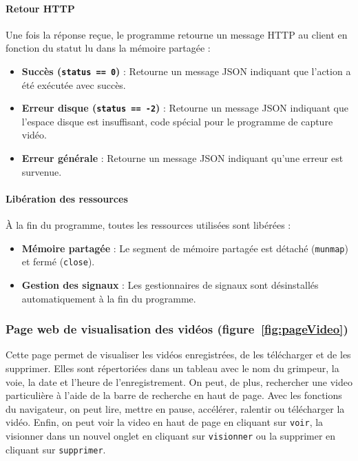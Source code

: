 \documentclass[a4paper, 11pt, french]{article}
\begin{document}
\paragraph{Retour HTTP}
Une fois la réponse reçue, le programme retourne un message HTTP au client en fonction du statut lu dans la mémoire partagée :
\begin{itemize}
    \item \textbf{Succès (\texttt{status == 0})} : Retourne un message JSON indiquant que l'action a été exécutée avec succès.
    \item \textbf{Erreur disque (\texttt{status == -2})} : Retourne un message JSON indiquant que l'espace disque est insuffisant, code spécial pour le programme de capture vidéo.
    \item \textbf{Erreur générale} : Retourne un message JSON indiquant qu'une erreur est survenue.
\end{itemize}

\paragraph{Libération des ressources}
À la fin du programme, toutes les ressources utilisées sont libérées :
\begin{itemize}
    \item \textbf{Mémoire partagée} : Le segment de mémoire partagée est détaché (\texttt{munmap}) et fermé (\texttt{close}).
    \item \textbf{Gestion des signaux} : Les gestionnaires de signaux sont désinstallés automatiquement à la fin du programme.
\end{itemize}


\subsubsection{Page web de visualisation des vidéos (figure~\ref{fig:pageVideo})}
Cette page permet de visualiser les vidéos enregistrées, de les télécharger et de les supprimer. Elles sont répertoriées dans un tableau avec le nom du grimpeur, la voie, la date et l'heure de l'enregistrement. On peut, de plus, rechercher une video particulière à l'aide de la barre de recherche en haut de page. Avec les fonctions du navigateur, on peut lire, mettre en pause, accélérer, ralentir ou télécharger la vidéo. Enfin, on peut voir la video en haut de page en cliquant sur \texttt{voir}, la visionner dans un nouvel onglet en cliquant sur \texttt{visionner} ou la supprimer en cliquant sur \texttt{supprimer}.
\end{document}
